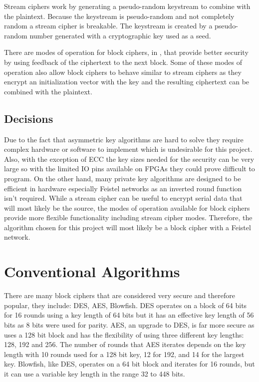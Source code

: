 \documentclass[12pt,twoside,a4paper]{report}
\begin{document}
    
    Stream ciphers work by generating a pseudo-random keystream to combine with the plaintext\cite{Robshaw1995}. Because the keystream is pseudo-random and not completely random a stream cipher is breakable. The keystream is created by a pseudo-random number generated with a cryptographic key used as a seed.
    
    There are modes of operation for block ciphers, in \cite{Dworkin2001}, that provide better security by using feedback of the ciphertext to the next block. Some of these modes of operation also allow block ciphers to behave similar to stream ciphers as they encrypt an initialization vector with the key and the resulting ciphertext can be combined with the plaintext.
    
    \subsection{Decisions}
    \label{section:cryp_decisions}
    Due to the fact that asymmetric key algorithms are hard to solve they require complex hardware or software to implement which is undesirable for this project. Also, with the exception of ECC the key sizes needed for the security can be very large so with the limited IO pins available on FPGAs they could prove difficult to program. On the other hand, many private key algorithms are designed to be efficient in hardware especially Feistel networks as an inverted round function isn't required. While a stream cipher can be useful to encrypt serial data that will most likely be the source, the modes of operation available for block ciphers provide more flexible functionality including stream cipher modes. Therefore, the algorithm chosen for this project will most likely be a block cipher with a Feistel network.
    
    \section{Conventional Algorithms}
    There are many block ciphers that are considered very secure and therefore popular, they include: DES\cite{ComputerSecurityDivision1999}, AES\cite{ComputerSecurityDivision2001}, Blowfish\cite{BruceSchneier1994}.
    DES operates on a block of 64 bits for 16 rounds using a key length of 64 bits but it has an effective key length of 56 bits as 8 bits were used for parity.
    AES, an upgrade to DES, is far more secure as uses a 128 bit block and has the flexibility of using three different key lengths: 128, 192 and 256. The number of rounds that AES iterates depends on the key length with 10 rounds used for a 128 bit key, 12 for 192, and 14 for the largest key.
    Blowfish, like DES, operates on a 64 bit block and iterates for 16 rounds, but it can use a variable key length in the range 32 to 448 bits.
    
\end{document}
